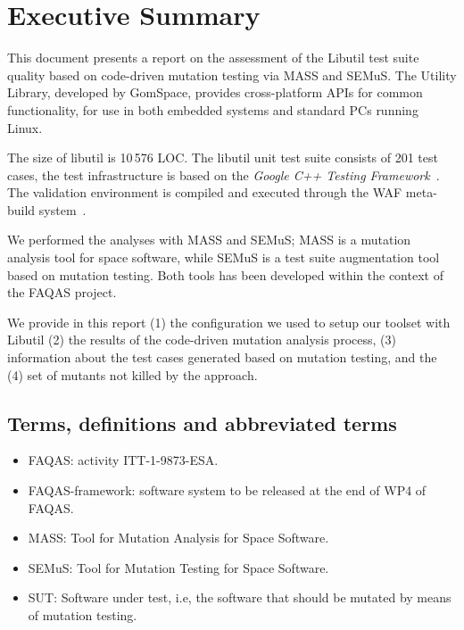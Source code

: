 
\chapter{Executive Summary}

This document presents a report on the assessment of the Libutil test suite quality based on code-driven mutation testing via MASS and SEMuS. The Utility Library, developed by GomSpace, provides cross-platform APIs for common functionality, for use in both embedded systems and standard PCs running Linux. 

The size of libutil is 10\,576 LOC. The libutil unit test suite consists of 201 test cases, the test infrastructure is based on the \emph{Google C++ Testing Framework}~\cite{googletest}. The validation environment is compiled and executed through the WAF meta-build system~\cite{waf}.

We performed the analyses with MASS and SEMuS; MASS is a mutation analysis tool for space software, while SEMuS is a test suite augmentation tool based on mutation testing. Both tools has been developed within the context of the FAQAS project.

We provide in this report (1) the configuration we used to setup our toolset with Libutil (2) the results of the code-driven mutation analysis process, (3) information about the test cases generated based on mutation testing, and the (4) set of mutants not killed by the approach.




\section{Terms, definitions and abbreviated terms}

\begin{itemize}
\item{FAQAS}: activity ITT-1-9873-ESA.
\item{FAQAS-framework}: software system to be released at the end of WP4 of FAQAS.
\item{MASS}: Tool for Mutation Analysis for Space Software.
\item{SEMuS}: Tool for Mutation Testing for Space Software.
\item{SUT}: Software under test, i.e, the software that should be mutated by means of mutation testing.

\end{itemize}

\clearpage

